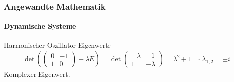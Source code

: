 \documentclass{beamer}
\begin{document}
 \begin{frame}
    \frametitle{Angewandte Mathematik}
\framesubtitle{Dynamische Systeme }

\begin{block}{Harmonischer Oszillator Eigenwerte}
    \begin{align*}
    \det (\begin{pmatrix}
        0 & -1  \\ 1 & 0
    \end{pmatrix} - \lambda E) = 
    \det \begin{pmatrix}
        -\lambda & -1  \\ 1 & -\lambda  
    \end{pmatrix} = \lambda^2 +1 \Rightarrow \lambda_{1,2} = \pm i
\end{align*}
Komplexer Eigenwert.
 \end{block}
 \end{frame}
\end{document}
